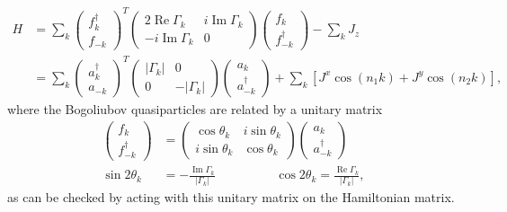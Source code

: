 \documentclass[aps,pra,preprint,groupedaddress]{revtex4-1}
\DeclareMathOperator{\re}{Re}
\DeclareMathOperator{\im}{Im}
\newcommand{\1}{\mathds{1}}
\begin{document}
\begin{align}
H &= \sum_k \left( \begin{array}{c}
 f^\dagger_k \\
 f_{-k} 
\end{array} \right)^T
\left( \begin{array}{cc}
 2 \re \Gamma_k & i \im \Gamma_k \\
 -i \im \Gamma_k &  0
\end{array} \right)
\left( \begin{array}{c}
 f_k \\
 f_{-k}^\dagger 
\end{array} \right) - \sum_k J_z \\
& = \sum_k \left( \begin{array}{c}
 a^\dagger_k \\
 a_{-k} 
\end{array} \right)^T
\left( \begin{array}{cc}
 |\Gamma_k| & 0 \\
 0 &  -|\Gamma_k|
\end{array} \right)
\left( \begin{array}{c}
 a_k \\
 a_{-k}^\dagger 
\end{array} \right) + \sum_k \left[J^x \cos(n_1 k) + J^y \cos(n_2 k) \right],
\end{align}
where the Bogoliubov quasiparticles are related by a unitary matrix \cite{Knolle}
\begin{align}
\left( \begin{array}{c}
 f_k \\
 f_{-k}^\dagger 
\end{array} \right) &= 
\left( \begin{array}{cc}
 \cos \theta_k & i \sin \theta_k \\
 i \sin \theta_k &  \cos \theta_k
\end{array} \right)
\left( \begin{array}{c}
 a_k \\
 a_{-k}^\dagger 
\end{array} \right) \\
\sin 2\theta_k &= -\frac{\im \Gamma_k}{|\Gamma_k|} \hspace{2cm} \cos 2\theta_k = \frac{\re \Gamma_k}{|\Gamma_k|},%
\end{align}
as can be checked by acting with this unitary matrix on the Hamiltonian matrix.
\end{document}
